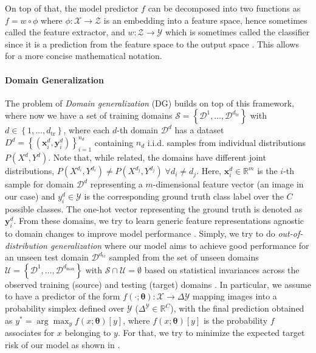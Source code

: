 On top of that, the model predictor $f$ can be decomposed into two functions as $f=w \circ \phi$ where $\phi: \mathcal{X} \rightarrow \mathcal{Z}$ is an embedding into a feature space, hence sometimes called the feature extractor, and $w: \mathcal{Z} \rightarrow \mathcal{Y}$ which is sometimes called the classifier since it is a prediction from the feature space to the output space \citep{gulrajani2020search, MotiianPAD17}. This allows for a more concise mathematical notation.

\paragraph{Domain Generalization}
The problem of \emph{Domain generalization} (DG) builds on top of this framework, where now we have a set of training domains $\mathcal{S} = \left\{\mathcal{D}^{1}, \ldots, \mathcal{D}^{d_{\mathrm{tr}}}\right\}$ with $d \in\left\{1, \ldots, d_{\mathrm{tr}}\right\}$, where each $d$-th domain $\mathcal{D}^d$ has a dataset $D^{d}=\left\{\left(\mathbf{x}_{i}^{d}, \mathbf{y}_{i}^{d}\right)\right\}_{i=1}^{n_{d}}$ containing $n_d$ i.i.d. samples from individual distributions $P\left(X^{d}, Y^{d}\right)$. Note that, while related, the domains have different joint distributions, \ie $P\left(X^{d_i}, Y^{d_i}\right)\neq P\left(X^{d_j}, Y^{d_j}\right) \;\forall d_i\neq d_j$. Here, $\mathbf{x}_i^d \in \mathbb{R}^{m}$ is the $i$-th sample for domain $\mathcal{D}^d$ representing a $m$-dimensional feature vector (\ie an image in our case) and $y_i^d \in \mathcal{Y}$ is the corresponding ground truth class label over the $C$ possible classes. The one-hot vector representing the ground truth is denoted as $\mathbf{y}^d_i$. From these domains, we try to learn generic feature representations agnostic to domain changes to improve model performance \citep{seo2019learning}. Simply, we try to do \emph{out-of-distribution generalization} where our model aims to achieve good performance for an unseen test domain $\mathcal{D}^{d_\mathrm{te}}$ sampled from the set of unseen domains $\mathcal{U} = \left\{\mathcal{D}^{1}, \ldots, \mathcal{D}^{d_{\mathrm{max}}}\right\}$ with $\mathcal{S} \cap \mathcal{U}=\emptyset$ based on statistical invariances across the observed training (source) and testing (target) domains \citep{gulrajani2020search, huang2020selfchallenging}. In particular, we assume to have a predictor of the form $f(\cdot;\boldsymbol{\theta}): \mathcal{X} \rightarrow \Delta\mathcal{Y}$ mapping images into a probability simplex defined over $\mathcal{Y}$ (\ie $\Delta^\mathcal{Y}\in \mathbb{R}^C$), with the final prediction obtained as $y^*=\arg\max_y f(x;\boldsymbol{\theta})[y]$, where $f(x;\boldsymbol{\theta})[y]$ is the probability $f$ associates for $x$ belonging to $y$. For that, we try to minimize the expected target risk of our model as shown in .
